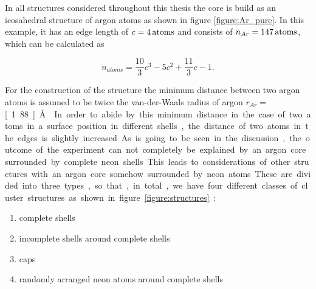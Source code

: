 In all structures considered throughout this thesis the core is build as
 an icosahedral
structure of argon atoms as shown in figure \ref{figure:Ar_pure}.
In this example, it has an edge length
of $c=\unit[4]{atoms}$ and consists of $n_{Ar}=\unit[147]{atoms}$, which can be
calculated as \cite{Martin96}

\begin{equation}
  n_{atoms} = \frac{10}{3} c^3 - 5 c^2 + \frac{11}{3} c -1 .
\end{equation}

For the construction of the structure the minimum
distance between two argon
atoms is assumed to be twice the van-der-Waals
radius of argon $r_{Ar}=$ \unit[1.88]{\AA} \cite{Bondi64}. In order to abide by this
minimum distance in the case of two atoms in a surface position in different
shells, the distance of two atoms in the edges is slightly increased.

As is going to be seen in the discussion, the outcome of the experiment
can not completely be explained by an argon core surrounded by complete neon shells.
This leads to considerations of other structures with an argon core somehow surrounded
by neon atoms. These are divided into three types, so that, in total, we have four
different classes of cluster structures as shown in figure \ref{figure:structures}:

\begin{enumerate}
 \item complete shells
 \item incomplete shells around complete shells
 \item caps
 \item randomly arranged neon atoms around complete shells
\end{enumerate}

